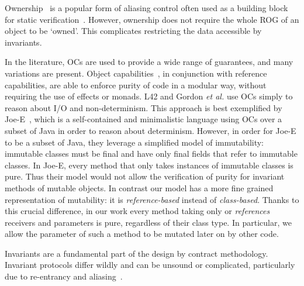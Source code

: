 Ownership~\cite{ClarkeEtAl13,ZibinEtAl10,DietlEtAl07} is a popular form of aliasing control often used as a building block for static verification~\cite{%
muller2002modular,%
barnett2011specification%
}.  However, ownership does not require the whole ROG of an object to be `owned'. This complicates restricting the data accessible by invariants.

In the literature, OCs are used to provide a wide range of guarantees, and many variations are present.
Object capabilities~\cite{RobustComposition}, in conjunction with reference capabilities, are able to
 enforce purity of code in a modular way, without requiring the use of effects or monads.
L42 and Gordon \textit{et al.} use OCs simply to reason about I/O and non-determinism. This approach is best exemplified by Joe-E~\cite{finifter2008verifiable}, which is a self-contained and minimalistic language using OCs over a subset of Java in order to reason about determinism.
However, in order for Joe-E to be a subset of Java, they leverage a simplified model of immutability:
immutable classes must be final and have only final fields that refer to immutable classes.
In Joe-E, every method that only takes instances of immutable classes is pure.
Thus their model would not allow the verification of purity for invariant methods of mutable objects.
In contrast our model has a more fine grained representation of mutability: it is \emph{reference-based} instead of \emph{class-based}.
Thanks to this crucial difference, in our work every method taking only \Q@read@ or \Q@imm@ \emph{references} receivers and parameters is pure, regardless of their class type. In particular, we allow the parameter of such a method to be mutated later on by other code.

Invariants are a fundamental part of the design by contract methodology. 
Invariant protocols differ wildly and can be unsound or complicated, particularly due to re-entrancy and aliasing~\cite{leino2004object,drossopoulou2008unified,meyer2016class}. 

